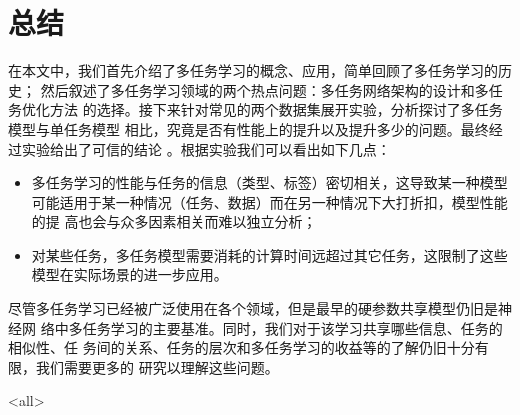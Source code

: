 \documentclass[../main]{subfiles}
\begin{document}
\mode*

\chapter{总结}%
\label{cha:conclusion}

在本文中，我们首先介绍了多任务学习的概念、应用，简单回顾了多任务学习的历史；
然后叙述了多任务学习领域的两个热点问题：多任务网络架构的设计和多任务优化方法
的选择。接下来针对常见的两个数据集展开实验，分析探讨了多任务模型与单任务模型
相比，究竟是否有性能上的提升以及提升多少的问题。最终经过实验给出了可信的结论
。根据实验我们可以看出如下几点：

\begin{itemize}
  \item 多任务学习的性能与任务的信息（类型、标签）密切相关，这导致某一种模型
    可能适用于某一种情况（任务、数据）而在另一种情况下大打折扣，模型性能的提
    高也会与众多因素相关而难以独立分析；
  \item 对某些任务，多任务模型需要消耗的计算时间远超过其它任务，这限制了这些
    模型在实际场景的进一步应用。
\end{itemize}

尽管多任务学习已经被广泛使用在各个领域，但是最早的硬参数共享模型仍旧是神经网
络中多任务学习的主要基准。同时，我们对于该学习共享哪些信息、任务的相似性、任
务间的关系、任务的层次和多任务学习的收益等的了解仍旧十分有限，我们需要更多的
研究以理解这些问题。

\mode<all>
\end{document}
